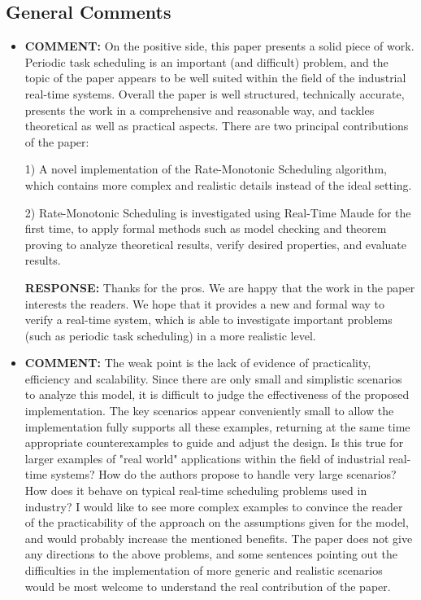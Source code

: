 \documentclass[10pt,journal]{IEEEtran}
\newcommand{\hide}[1]{\ignorespaces}
\newcommand{\ANSWER}{{\bf RESPONSE: }}
\newcommand{\COMMENT}{{\bf COMMENT: }}
\begin{document}
\subsection{General Comments}
\begin{itemize}

\item
\hide{ The paper shows a realistic implementation of a Rate-Monotonic
  Scheduling algorithm using Real-Time Maude (a modeling language
  based on rewriting logic) by taking into account the overhead of
  scheduling and some other details of the hardware platform. The
  correctness of the implementation with respect to the algorithm and
  the completeness of the model are verified by model checking, and
  validated within different realistic scenarios.}  
\COMMENT On the positive side, this paper presents a solid piece of
work. Periodic task scheduling is an important (and difficult)
problem, and the topic of the paper appears to be well suited within
the field of the industrial real-time systems. Overall the paper is
well structured, technically accurate, presents the work in a
comprehensive and reasonable way, and tackles theoretical as well as
practical aspects. There are two principal contributions of the paper:

1) A novel implementation of the Rate-Monotonic Scheduling algorithm,
which contains more complex and realistic details instead of the ideal
setting.

2) Rate-Monotonic Scheduling is investigated using Real-Time Maude for
the first time, to apply formal methods such as model checking and
theorem proving to analyze theoretical results, verify desired
properties, and evaluate results.

\ANSWER Thanks for the pros. We are happy that the work in the paper
interests the readers. We hope that it provides a new and formal way
to verify a real-time system, which is able to investigate important
problems (such as periodic task scheduling) in a more realistic level.

\item
\COMMENT The weak point is the lack of evidence of practicality,
efficiency and scalability. Since there are only small and simplistic
scenarios to analyze this model, it is difficult to judge the
effectiveness of the proposed implementation. The key scenarios appear
conveniently small to allow the implementation fully supports all
these examples, returning at the same time appropriate counterexamples
to guide and adjust the design. Is this true for larger examples of
"real world" applications within the field of industrial real-time
systems? How do the authors propose to handle very large scenarios?
How does it behave on typical real-time scheduling problems used in
industry? I would like to see more complex examples to convince the
reader of the practicability of the approach on the assumptions given
for the model, and would probably increase the mentioned benefits. The
paper does not give any directions to the above problems, and some
sentences pointing out the difficulties in the implementation of more
generic and realistic scenarios would be most welcome to understand
the real contribution of the paper.


\end{itemize}
\end{document}
